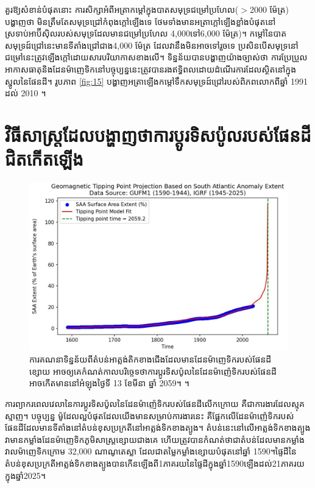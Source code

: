 \documentclass[10pt,twocolumn,letterpaper]{article}
\begin{document}
គួរឱ្យសំខាន់បំផុតនោះ ការសិក្សាអំពីអត្រាកម្តៅក្នុងបាតសមុទ្រជម្រៅប្រហែល($>$2000 ម៉ែត្រ) បង្ហាញថា មិនត្រឹមតែសមុទ្រជ្រៅកំពុងក្ដៅឡើងទេ ថែមទាំងមានអត្រាក្ដៅឡើងខ្លាំងបំផុតនៅស្រទាប់អាប៊ីស៊ិលរបស់សមុទ្រដែលមានជម្រៅប្រហែល 4,000ទៅ6,000 ម៉ែត្រ)។ កម្តៅនៃបាតសមុទ្រដ៍ជ្រៅនេះមានទីតាំងជ្រៅជាង4,000 ម៉ែត្រ \cite{132,129} ដែលវានឹងមិនអាចទៅរួចទេ ប្រសិនបើសមុទ្រនៅជម្រៅនេះត្រូវឡើងក្តៅដោយសារបរិយាកាសខាងលើ។ ទិន្នន័យបានបង្ហាញយ៉ាងច្បាស់ថា ការប្រែប្រួលអាកាសធាតុនិងដែនម៉ាញេទិកនៅបច្ចុប្បន្ននេះត្រូវបានរងឥទ្ធិពលដោយដំណើរការដែលស្ថិតនៅក្នុងស្នូលនៃផែនដី។ រូបភាព \ref{fig:15} បង្ហាញអត្រាឡើងកម្ដៅទឹកសមុទ្រដ៍ជ្រៅរបស់ពិភពលោកពីឆ្នាំ 1991 ដល់ 2010 \cite{132}។

\section{វិធីសាស្ត្រដែលបង្ហាញថាការប្តូរទិសប៉ូលរបស់ផែនដីជិតកើតឡើង}

\begin{figure}[b]
\begin{center}
   \includegraphics[width=1\linewidth]{saa-crop.jpeg}
\end{center}
   \caption{ការគណនាទិន្នន័យពីតំបន់អាត្លង់តិកខាងជើងដែលមានដែនម៉ាញេទិករបស់ផែនដីខ្សោយ អាចឲ្យគេកំណត់កាលបរិច្ចេទថាការប្តូរទិសប៉ូលនៃដែនម៉ាញ៉េទិករបស់ផែនដីអាចកើតមាននៅអំឡុងថ្ងៃទី 13 ខែមីនា ឆ្នាំ 2059។ \cite{125,126}។}
\label{fig:16}
\label{fig:onecol}
\end{figure}

ការព្យាករពេលវេលានៃការប្តូរទិសប៉ូលនៃដែនម៉ាញ៉េទិករបស់ផែនដីលើកក្រោយ គឺជាការងារដែលស្មុគស្មាញ។ បច្ចុប្បន្ន ម៉ូដែលល្អបំផុតដែលយើងមានសម្រាប់ការងារនេះ គឺផ្អែកលើដែនម៉ាញ៉េទិករបស់ផែនដីដែលមានទីតាំងនៅតំបន់ខុសប្រក្រតីនៅអាត្លង់ទិកខាងត្បូង។ តំបន់នេះនៅលើអាត្លង់ទិកខាងត្បូង វាមានកម្លាំងដែនម៉ាញេទិកភូមិសាស្ត្រខ្សោយជាងគេ ហើយត្រូវបានកំណត់ថាជាតំបន់ដែលមានកម្លាំងវាលម៉ាញេទិកក្រោម 32,000 ណាណូតេស្លា \cite{135} ដែលជាតម្លៃកម្លាំងខ្សោយបំផុតនៅឆ្នាំ 1590។​ផ្ទៃដីនៃតំបន់ខុសប្រក្រតីអាត្លង់ទិកខាងត្បូងបានកើនឡើងពី1ភាគរយនៃផ្ទៃដីក្នុងឆ្នាំ​1590​ឡើងដល់21ភាគរយក្នុងឆ្នាំ2025\cite{136}។
\end{document}
